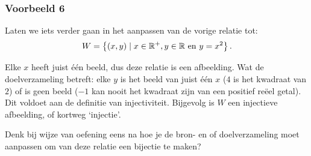 \subsubsection*{Voorbeeld 6}
Laten we iets verder gaan in het aanpassen van de vorige relatie tot:
\[
W=\left\{(x,y)\mid x\in\mathbb{R}^+, y\in\mathbb{R} \mathrm{~en~} y=x^2\right\}.
\]

Elke $x$ heeft juist één beeld, dus deze relatie is een afbeelding. Wat de doelverzameling betreft: elke $y$ is het beeld van juist één $x$ ($4$ is het kwadraat van $2$) of is geen beeld ($-1$ kan nooit het kwadraat zijn van een positief reëel getal). Dit voldoet aan de definitie van injectiviteit. Bijgevolg is $W$ een injectieve afbeelding, of kortweg `injectie'.

Denk bij wijze van oefening eens na hoe je de bron- en of doelverzameling moet aanpassen om van deze relatie een bijectie te maken?








